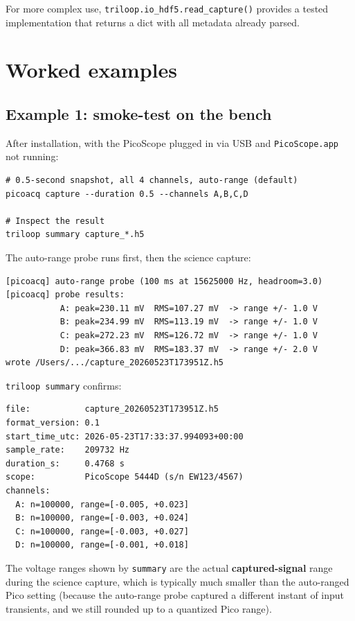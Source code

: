 \documentclass[11pt]{article}
\begin{document}
For more complex use, \texttt{triloop.io\_hdf5.read\_capture()}
provides a tested implementation that returns a dict with all metadata
already parsed.

\section{Worked examples}

\subsection{Example 1: smoke-test on the bench}

After installation, with the PicoScope plugged in via USB and
\texttt{PicoScope.app} not running:

\begin{lstlisting}[style=shell]
# 0.5-second snapshot, all 4 channels, auto-range (default)
picoacq capture --duration 0.5 --channels A,B,C,D

# Inspect the result
triloop summary capture_*.h5
\end{lstlisting}

The auto-range probe runs first, then the science capture:
\begin{lstlisting}[style=shell]
[picoacq] auto-range probe (100 ms at 15625000 Hz, headroom=3.0)
[picoacq] probe results:
           A: peak=230.11 mV  RMS=107.27 mV  -> range +/- 1.0 V
           B: peak=234.99 mV  RMS=113.19 mV  -> range +/- 1.0 V
           C: peak=272.23 mV  RMS=126.72 mV  -> range +/- 1.0 V
           D: peak=366.83 mV  RMS=183.37 mV  -> range +/- 2.0 V
wrote /Users/.../capture_20260523T173951Z.h5
\end{lstlisting}

\texttt{triloop summary} confirms:
\begin{lstlisting}[style=shell]
file:           capture_20260523T173951Z.h5
format_version: 0.1
start_time_utc: 2026-05-23T17:33:37.994093+00:00
sample_rate:    209732 Hz
duration_s:     0.4768 s
scope:          PicoScope 5444D (s/n EW123/4567)
channels:
  A: n=100000, range=[-0.005, +0.023]
  B: n=100000, range=[-0.003, +0.024]
  C: n=100000, range=[-0.003, +0.027]
  D: n=100000, range=[-0.001, +0.018]
\end{lstlisting}

The voltage ranges shown by \texttt{summary} are the actual
\textbf{captured-signal} range during the science capture, which is
typically much smaller than the auto-ranged Pico setting (because the
auto-range probe captured a different instant of input transients,
and we still rounded up to a quantized Pico range).
\end{document}

